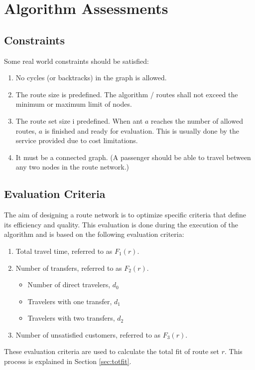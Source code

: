 \section{Algorithm Assessments}

\subsection{Constraints}
\label{sec:algoConstraints}
Some real world constraints should be satisfied:
\begin{enumerate}
\item \label{itm:constraintCycles} No cycles (or backtracks) in the graph is allowed.
\item \label{itm:constraintRouteSize} The route size is predefined. The algorithm / routes shall not exceed the minimum or maximum limit of nodes.
\item \label{itm:constraintRouteSetSize} The route set size i predefined. When ant $a$ reaches the number of allowed routes, $a$ is finished and ready for evaluation. This is usually done by the service provided due to cost limitations.
\item \label{itm:criteriaConnectedGraph} It must be a connected graph. (A passenger should be able to travel between any two nodes in the route network.) 
\end{enumerate}

\subsection{Evaluation Criteria} 
The aim of designing a route network is to optimize specific criteria that define its efficiency and quality. This evaluation is done during the execution of the algorithm and is based on the following evaluation criteria:
\begin{enumerate}
\item \label{itm:criteriaTotalTravelTime} Total travel time, referred to as $F_1(r)$.
\item \label{itm:f2} Number of transfers, referred to as $F_2(r)$.
\begin{itemize}
\item Number of direct travelers, $d_0$
\item Travelers with one transfer, $d_1$
\item Travelers with two transfers, $d_2$
\end{itemize}
\item Number of unsatisfied customers, referred to as $F_3(r)$. 
\end{enumerate}
These evaluation criteria are used to calculate the total fit of route set $r$. This process is explained in Section \vref{sec:totfit}.



